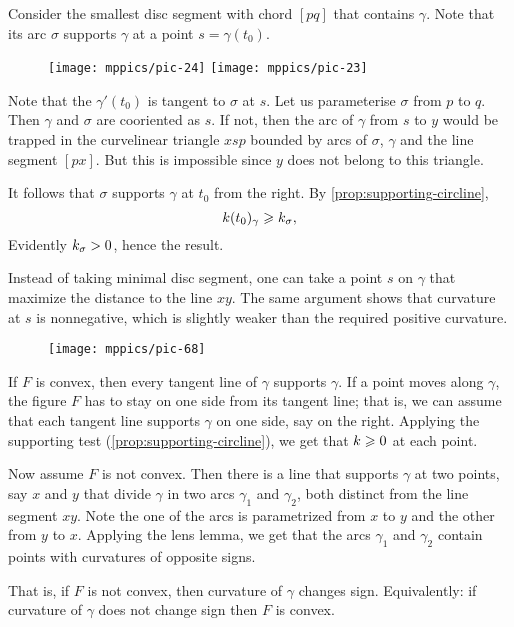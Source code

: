 Consider the smallest disc segment with chord $[pq]$ that contains $\gamma$.
Note that its arc $\sigma$ supports $\gamma$ at a point $s=\gamma(t_0)$.

\begin{wrapfigure}{o}{50 mm}
\centering
\texttt{[image: mppics/pic-24]}
\bigskip
\texttt{[image: mppics/pic-23]}
\vskip0mm
\end{wrapfigure}

Note that the $\gamma'(t_0)$ is tangent to $\sigma$ at $s$.
Let us parameterise $\sigma$ from $p$ to $q$.
Then $\gamma$ and $\sigma$ are cooriented as $s$.
If not, then the arc of $\gamma$ from $s$ to $y$ would be trapped in the curvelinear triangle $xsp$ bounded by arcs of $\sigma$, $\gamma$ and the line segment $[px]$.
But this is impossible since $y$ does not belong to this triangle.

It follows that $\sigma$ supports $\gamma$ at $t_0$ from the right.
By \ref{prop:supporting-circline}, 
\[k(t_0)_\gamma\geqslant k_\sigma,\]
Evidently $k_\sigma>0$, hence the result.
\qeds

Instead of taking minimal disc segment, one can take a point $s$ on $\gamma$ that maximize the distance to the line $xy$.
The same argument shows that curvature at $s$ is nonnegative, which is slightly weaker than the required positive curvature.

\begin{wrapfigure}{o}{35 mm}
\centering
\texttt{[image: mppics/pic-68]}
\vskip0mm
\end{wrapfigure}

If $F$ is convex, then every tangent line of $\gamma$ supports $\gamma$.
If a point moves along $\gamma$, the figure $F$ has to stay on one side from its tangent line;
that is, we can assume that each tangent line supports $\gamma$ on one side, say on the right.
Applying the supporting test (\ref{prop:supporting-circline}), we get that $k\geqslant 0$ at each point.

Now assume $F$ is not convex.
Then there is a line that supports $\gamma$ at two points, say $x$ and $y$ that divide $\gamma$ in two arcs $\gamma_1$ and $\gamma_2$, both distinct from the line segment $xy$.
Note the one of the arcs is parametrized from $x$ to $y$ and the other from $y$ to $x$.
Applying the lens lemma, we get that the arcs $\gamma_1$ and $\gamma_2$ contain points with curvatures of opposite signs.

That is, if $F$ is not convex, then curvature of $\gamma$ changes sign.
Equivalently: if curvature of $\gamma$ does not change sign then $F$ is convex.
\qeds

